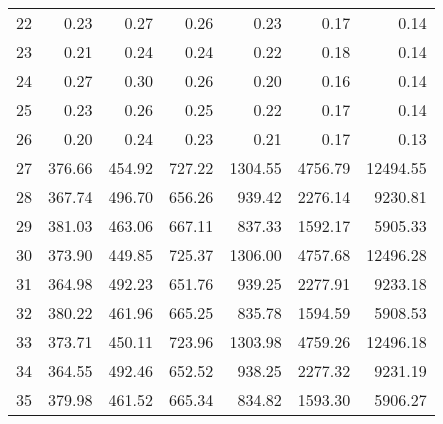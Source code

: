 \begin{tabular}{lrrrrrr}
22 &    0.23 &    0.27 &    0.26 &     0.23 &     0.17 &      0.14 \\
23 &    0.21 &    0.24 &    0.24 &     0.22 &     0.18 &      0.14 \\
24 &    0.27 &    0.30 &    0.26 &     0.20 &     0.16 &      0.14 \\
25 &    0.23 &    0.26 &    0.25 &     0.22 &     0.17 &      0.14 \\
26 &    0.20 &    0.24 &    0.23 &     0.21 &     0.17 &      0.13 \\
27 &  376.66 &  454.92 &  727.22 &  1304.55 &  4756.79 &  12494.55 \\
28 &  367.74 &  496.70 &  656.26 &   939.42 &  2276.14 &   9230.81 \\
29 &  381.03 &  463.06 &  667.11 &   837.33 &  1592.17 &   5905.33 \\
30 &  373.90 &  449.85 &  725.37 &  1306.00 &  4757.68 &  12496.28 \\
31 &  364.98 &  492.23 &  651.76 &   939.25 &  2277.91 &   9233.18 \\
32 &  380.22 &  461.96 &  665.25 &   835.78 &  1594.59 &   5908.53 \\
33 &  373.71 &  450.11 &  723.96 &  1303.98 &  4759.26 &  12496.18 \\
34 &  364.55 &  492.46 &  652.52 &   938.25 &  2277.32 &   9231.19 \\
35 &  379.98 &  461.52 &  665.34 &   834.82 &  1593.30 &   5906.27 \\
\bottomrule
\end{tabular}
